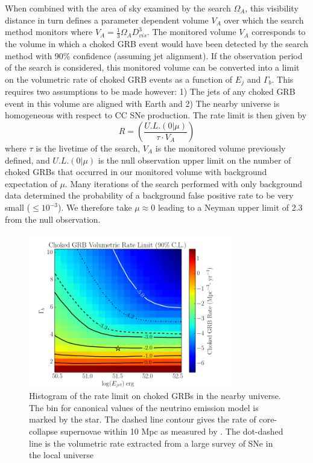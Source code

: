 \documentclass[manuscript]{aastex}
\begin{document}
When combined with the area of sky examined by the search $\Omega_{A}$, this visibility distance in turn defines a parameter dependent volume $V_A$ over which the search method monitors where $V_A=\frac{1}{3}\Omega_{A}D_{vis}^{3}$. The monitored volume $V_A$ corresponds to the volume in which a choked GRB event would have been detected by the search method with 90$\%$ confidence (assuming jet alignment). If the observation period of the search is considered, this monitored volume can be converted into a limit on the volumetric rate of choked GRB events as a function of $E_j$ and $\Gamma_b$. This requires two assumptions to be made however: 1) The jets of any choked GRB event in this volume are aligned with Earth and 2) The nearby universe is homogeneous with respect to CC SNe production. The rate limit is then given by
\begin{equation}\label{eq:ratelimit}
R = \left(\frac{U.L.(0|\mu)}{\tau \cdot V_A}\right)
\end{equation}
where $\tau$ is the livetime of the search, $V_A$ is the monitored volume previously defined, and $U.L.(0|\mu)$ is the null observation upper limit on the number of choked GRBs that occurred in our monitored volume with background expectation of $\mu$. Many iterations of the search performed with only background data determined the probability of a background false positive rate to be very small ($\leq 10^{-3}$). We therefore take $\mu\approx0$ leading to a Neyman upper limit of 2.3 from the null observation.
\begin{figure}[ht]
  \begin{center}
    \includegraphics[width=0.8\textwidth,keepaspectratio]{plots/RateLimit_2DHisto_wContours_SysAdj.png}
  \end{center}
  \caption[Choked GRB Volumetric Rate Limit]{Histogram of the rate limit on choked GRBs in the nearby universe. The bin for canonical values of the neutrino emission model is marked by the star. The dashed line contour gives the rate of core-collapse supernovae within 10 Mpc as measured by \cite{2011PhRvD..83l3008K}. The dot-dashed line is the volumetric rate extracted from a large survey of SNe in the local universe \citep{2011MNRAS.412.1419L}}
  \label{fig:VolumetricRateLimit}
\end{figure}
\end{document}

